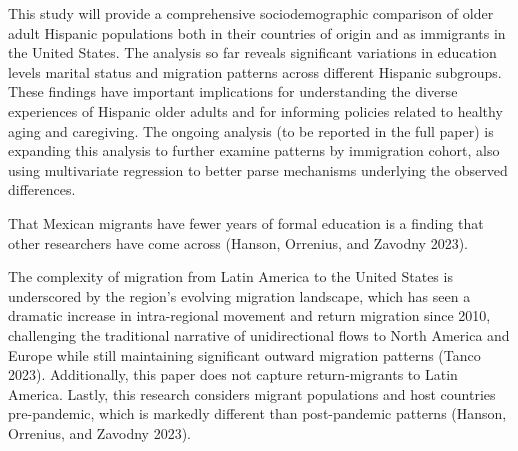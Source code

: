 \documentclass[
]{article}
\begin{document}
This study will provide a comprehensive sociodemographic comparison of
older adult Hispanic populations both in their countries of origin and
as immigrants in the United States. The analysis so far reveals
significant variations in education levels marital status and migration
patterns across different Hispanic subgroups. These findings have
important implications for understanding the diverse experiences of
Hispanic older adults and for informing policies related to healthy
aging and caregiving. The ongoing analysis (to be reported in the full
paper) is expanding this analysis to further examine patterns by
immigration cohort, also using multivariate regression to better parse
mechanisms underlying the observed differences.

That Mexican migrants have fewer years of formal education is a finding
that other researchers have come across (Hanson, Orrenius, and Zavodny
2023).

The complexity of migration from Latin America to the United States is
underscored by the region's evolving migration landscape, which has seen
a dramatic increase in intra-regional movement and return migration
since 2010, challenging the traditional narrative of unidirectional
flows to North America and Europe while still maintaining significant
outward migration patterns (Tanco 2023). Additionally, this paper does
not capture return-migrants to Latin America. Lastly, this research
considers migrant populations and host countries pre-pandemic, which is
markedly different than post-pandemic patterns (Hanson, Orrenius, and
Zavodny 2023).
\end{document}

